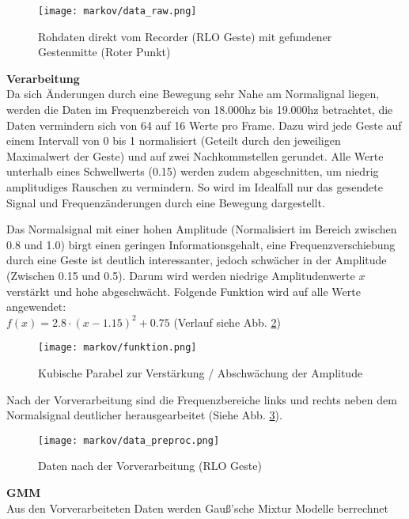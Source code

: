 \begin{figure}[htbp] \centering
    \texttt{[image: markov/data\_raw.png]}
    \caption{Rohdaten direkt vom Recorder (\acl{RLO} Geste) mit gefundener Gestenmitte (Roter Punkt)}
    \label{fig:data_raw}
\end{figure}

\textbf{Verarbeitung}\\
Da sich Änderungen durch eine Bewegung sehr Nahe am Normalignal liegen, werden die Daten im 
Frequenzbereich von 18.000hz bis 19.000hz betrachtet, die Daten vermindern sich von 64 auf 16 Werte pro Frame. 
Dazu wird jede Geste auf einem Intervall von 0 bis 1 normalisiert (Geteilt durch den jeweiligen Maximalwert der Geste) und 
auf zwei Nachkommstellen gerundet. 
Alle Werte unterhalb eines Schwellwerts (0.15) werden zudem abgeschnitten, um niedrig amplitudiges Rauschen zu vermindern. 
So wird im Idealfall nur das gesendete Signal und Frequenzänderungen durch eine Bewegung dargestellt.

Das Normalsignal mit einer hohen Amplitude (Normalisiert im Bereich zwischen 0.8 und 1.0) birgt einen geringen Informationsgehalt, 
eine Frequenzverschiebung durch eine Geste ist deutlich interessanter, jedoch schwächer in der Amplitude (Zwischen 0.15 und 0.5).
Darum wird werden niedrige Amplitudenwerte \( x \) verstärkt und hohe abgeschwächt. Folgende Funktion wird auf alle Werte angewendet: \\
\( f(x) = 2.8 \cdot ( x - 1.15 )^2 + 0.75 \) (Verlauf siehe Abb. \ref{fig:funktion})
\begin{figure}[htbp] \centering
    \texttt{[image: markov/funktion.png]}
    \caption{Kubische Parabel zur Verstärkung / Abschwächung der Amplitude}
    \label{fig:funktion}
\end{figure}

Nach der Vorverarbeitung sind die Frequenzbereiche links und rechts neben dem Normalsignal deutlicher herausgearbeitet (Siehe Abb. \ref{fig:data_preproc}).  

\begin{figure}[htbp] \centering
    \texttt{[image: markov/data\_preproc.png]}
    \caption{Daten nach der Vorverarbeitung (\acl{RLO} Geste)}
    \label{fig:data_preproc}
\end{figure}

\textbf{\acl{GMM}} \\
Aus den Vorverarbeiteten Daten werden Gauß’sche Mixtur Modelle berrechnet

